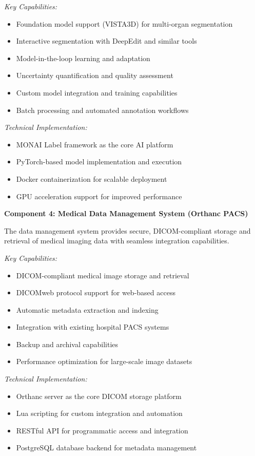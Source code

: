 \textit{Key Capabilities:}
\begin{itemize}
    \item Foundation model support (VISTA3D) for multi-organ segmentation
    \item Interactive segmentation with DeepEdit and similar tools
    \item Model-in-the-loop learning and adaptation
    \item Uncertainty quantification and quality assessment
    \item Custom model integration and training capabilities
    \item Batch processing and automated annotation workflows
\end{itemize}

\textit{Technical Implementation:}
\begin{itemize}
    \item MONAI Label framework as the core AI platform
    \item PyTorch-based model implementation and execution
    \item Docker containerization for scalable deployment
    \item GPU acceleration support for improved performance
\end{itemize}

\textbf{Component 4: Medical Data Management System (Orthanc PACS)}

The data management system provides secure, DICOM-compliant storage and retrieval of medical imaging data with seamless integration capabilities.

\textit{Key Capabilities:}
\begin{itemize}
    \item DICOM-compliant medical image storage and retrieval
    \item DICOMweb protocol support for web-based access
    \item Automatic metadata extraction and indexing
    \item Integration with existing hospital PACS systems
    \item Backup and archival capabilities
    \item Performance optimization for large-scale image datasets
\end{itemize}

\textit{Technical Implementation:}
\begin{itemize}
    \item Orthanc server as the core DICOM storage platform
    \item Lua scripting for custom integration and automation
    \item RESTful API for programmatic access and integration
    \item PostgreSQL database backend for metadata management
\end{itemize}

